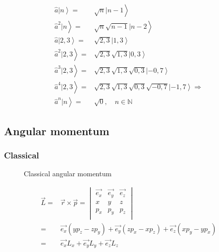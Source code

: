 	\begin{align}
		\left. \hat{a} | n \right\rangle =& \left.\sqrt{n}|n-1\right\rangle \\
		\left. \hat{a}^2 | n \right\rangle =& \left.\sqrt{n}\sqrt{n-1}|n-2\right\rangle \\
		\left. \hat{a} | 2,3 \right\rangle =& \left.\sqrt{2,3}|1,3\right\rangle \\
		\left. \hat{a}^2 | 2,3 \right\rangle =& \left.\sqrt{2,3}\sqrt{1,3}|0,3\right\rangle \\		
		\left. \hat{a}^3 | 2,3 \right\rangle =& \left.\sqrt{2,3}\sqrt{1,3}\sqrt{0,3}|-0,7\right\rangle \\		
		\left. \hat{a}^4 | 2,3 \right\rangle =& \left.\sqrt{2,3}\sqrt{1,3}\sqrt{0,3}\sqrt{-0,7}|-1,7\right\rangle \Rightarrow\\				
		\left. \hat{a}^n | n \right\rangle =& \sqrt{0}, \quad n  \in \mathds{N}
	\end{align}


	\subsection{Angular momentum}
	\label{sec:angmomentum}
	\subsubsection{Classical}
	\begin{figure}[!h]
		\centering
		
		\caption{Classical angular momentum}
		\label{clasmoment}
	\end{figure}
	
	\begin{align}
		\vec{L} =& \vec{r}\times\vec{p} =
		\begin{vmatrix}
			\vec{e_x} & \vec{e_y} & \vec{e_z} \\
			x & y & z \\
			p_x & p_y & p_z \\
		\end{vmatrix} \\
		=& \vec{e_x}(yp_z - zp_y) + \vec{e_y}(zp_x - xp_z) + \vec{e_z}(xp_y - yp_x) \\
		=& \vec{e_x}L_x + \vec{e_y}L_y + \vec{e_z}L_z
	\end{align}
	
